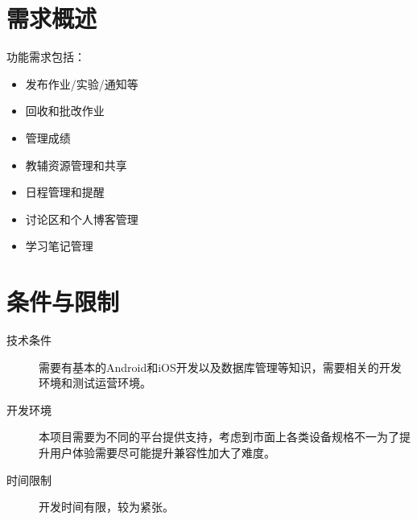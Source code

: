 \section{需求概述}
功能需求包括：
\begin{itemize}
  \item 发布作业/实验/通知等
  \item 回收和批改作业
  \item 管理成绩
  \item 教辅资源管理和共享
  \item 日程管理和提醒
  \item 讨论区和个人博客管理
  \item 学习笔记管理
\end{itemize}


\section{条件与限制}
\begin{description}
  \item[技术条件] 需要有基本的Android和iOS开发以及数据库管理等知识，需要相关的开发环境和测试运营环境。
  \item[开发环境] 本项目需要为不同的平台提供支持，考虑到市面上各类设备规格不一为了提升用户体验需要尽可能提升兼容性加大了难度。
  \item[时间限制] 开发时间有限，较为紧张。
\end{description}

